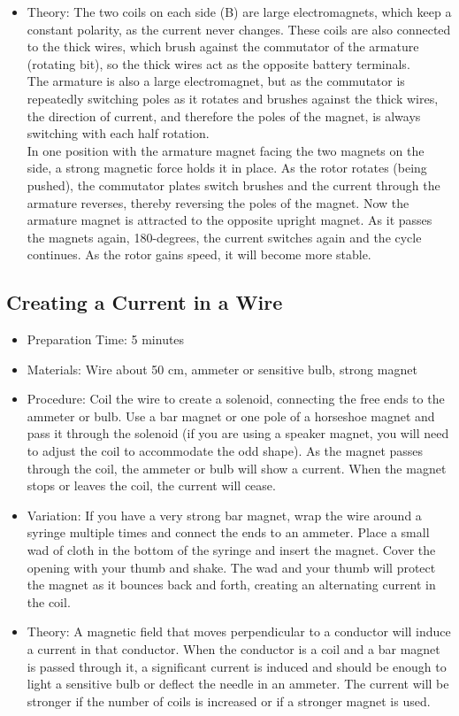 \begin{itemize}
\item{Theory: The two coils on each side (B) are large electromagnets, which keep a constant polarity, as the current never changes. These coils are also connected to the thick wires, which brush against the commutator of the armature (rotating bit), so the thick wires act as the opposite battery terminals.\\
The armature is also a large electromagnet, but as the commutator is repeatedly switching poles as it rotates and brushes against the thick wires, the direction of current, and therefore the poles of the magnet, is always switching with each half rotation.\\
In one position with the armature magnet facing the two magnets on the side, a strong magnetic force holds it in place. As the rotor rotates (being pushed), the commutator plates switch brushes and the current through the armature reverses, thereby reversing the poles of the magnet. Now the armature magnet is attracted to the opposite upright magnet. As it passes the magnets again, 180-degrees, the current switches again and the cycle continues. As the rotor gains speed, it will become more stable.}
\end{itemize}

\subsection{Creating a Current in a Wire}
\begin{itemize}
\item{Preparation Time: 5 minutes}
\item{Materials: Wire about 50 cm, ammeter or sensitive bulb, strong magnet}
\item{Procedure: Coil the wire to create a solenoid, connecting the free ends to the ammeter or bulb. Use a bar magnet or one pole of a horseshoe magnet and pass it through the solenoid (if you are using a speaker magnet, you will need to adjust the coil to accommodate the odd shape). As the magnet passes through the coil, the ammeter or bulb will show a current. When the magnet stops or leaves the coil, the current will cease.}
\item{Variation: If you have a very strong bar magnet, wrap the wire around a syringe multiple times and connect the ends to an ammeter. Place a small wad of cloth in the bottom of the syringe and insert the magnet. Cover the opening with your thumb and shake. The wad and your thumb will protect the magnet as it bounces back and forth, creating an alternating current in the coil.}
\item{Theory: A magnetic field that moves perpendicular to a conductor will induce a current in that conductor. When the conductor is a coil and a bar magnet is passed through it, a significant current is induced and should be enough to light a sensitive bulb or deflect the needle in an ammeter. The current will be stronger if the number of coils is increased or if a stronger magnet is used.}
\end{itemize}

